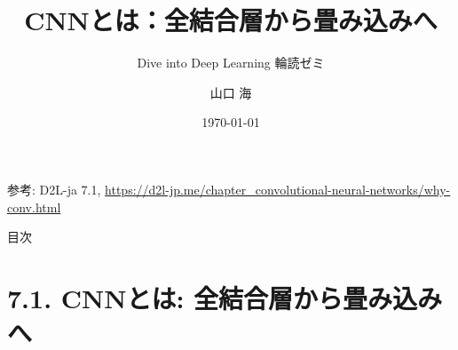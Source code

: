 \documentclass[dvipdfmx,uplatex,unicode,9pt,aspectratio=169]{beamer}
\title[全結合層から畳み込みへ]{CNNとは：全結合層から畳み込みへ}
\subtitle{Dive into Deep Learning 輪読ゼミ}
\author{山口 海}
\date{\today}
\begin{document}
\begin{frame}
  \titlepage
  \vspace{-1.5em}
  \begin{center}
    \footnotesize 参考: D2L-ja 7.1, \url{https://d2l-jp.me/chapter_convolutional-neural-networks/why-conv.html}
  \end{center}
\end{frame}

\begin{frame}[allowframebreaks]{目次}
  \tableofcontents[
    sectionstyle=show,
    subsectionstyle=show/show/show
  ]
\end{frame}

\section{7.1. CNNとは: 全結合層から畳み込みへ}
\end{document}
